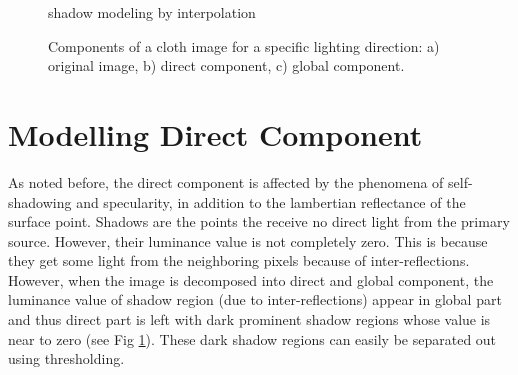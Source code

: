 \begin{figure}[t]
\centering
{}
\caption{shadow modeling by interpolation}
\end{figure}
\begin{center}
\begin{figure}[t]
\centering
{}
 \caption{Components of a cloth image for a specific
lighting direction: a) original image, b) direct component, c) global
component.} \label{fig:global}
\end{figure}
\end{center}
\section{Modelling Direct Component}

As noted before, the direct component is affected by the phenomena of
self-shadowing and specularity, in addition to the lambertian reflectance of the
surface point. Shadows are the points the receive no direct light from the
primary source. However, their luminance value is not completely zero. This is
because they get some light from the neighboring pixels because of
inter-reflections. However, when the image is decomposed into direct and global
component, the luminance value of shadow region (due to inter-reflections)
appear in global part and thus direct part is left with dark prominent shadow
regions whose value is near to zero (see Fig \ref{fig:global}). These dark shadow regions
can easily be separated out using thresholding.

